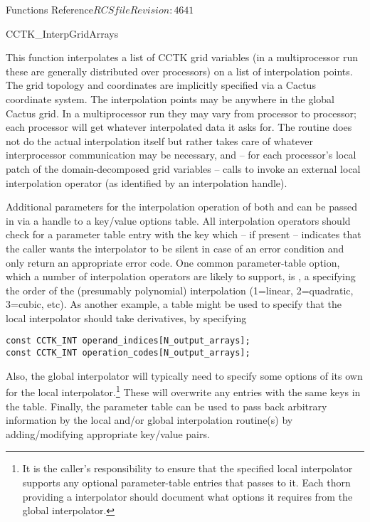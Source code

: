 \begin{cactuspart}{ Functions Reference}{$RCSfile$}{$Revision: 4641 $}
\begin{FunctionDescription}{CCTK\_InterpGridArrays}
\begin{Discussion}
This function interpolates a list of CCTK grid variables (in a multiprocessor run
these are generally distributed over processors) on a list of interpolation
points. The grid topology and coordinates are implicitly specified via a Cactus
coordinate system.
The interpolation points may be anywhere in the global Cactus grid.
In a multiprocessor run they may vary from processor to processor;
each processor will get whatever interpolated data it asks for.
The routine  does not do the actual interpolation
itself but rather takes care of whatever interprocessor communication may be
necessary, and -- for each processor's local patch of the domain-decomposed grid
variables -- calls  to invoke an external
local interpolation operator (as identified by an interpolation handle).

Additional parameters for the interpolation operation of both
 and  can be
passed in via a handle to a key/value options table.
All interpolation operators should check for a parameter table entry with the
key  which -- if present -- indicates that the
caller wants the interpolator to be silent in case of an error condition and
only return an appropriate error code.
One common parameter-table option, which a number of interpolation
operators are likely to support, is , a 
specifying the order of the (presumably polynomial) interpolation
(1=linear, 2=quadratic, 3=cubic, etc).
As another example, a table might be used to specify that the local interpolator
should take derivatives, by specifying
\begin{verbatim}
const CCTK_INT operand_indices[N_output_arrays];
const CCTK_INT operation_codes[N_output_arrays];
\end{verbatim}
Also, the global interpolator will typically need to specify some options
of its own for the local interpolator.\footnote{
It is the caller's responsibility to ensure that the specified local
interpolator supports any optional parameter-table entries that
 passes to it. Each thorn providing a
 interpolator should document what options it
requires from the global interpolator.
}
These will overwrite any entries
with the same keys in the  table.
Finally, the parameter table can be used to pass back arbitrary information
by the local and/or global interpolation routine(s) by adding/modifying
appropriate key/value pairs.


\end{Discussion}
\end{FunctionDescription}
\end{cactuspart}

